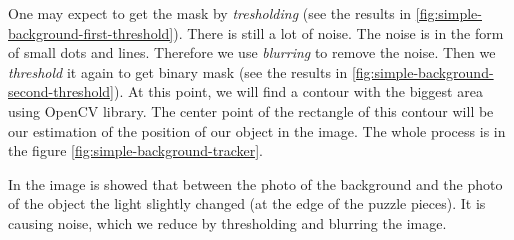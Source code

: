 One may expect to get the mask by \emph{tresholding} (see the results in
\ref{fig:simple-background-first-threshold}). There is still a lot of noise.
The noise is in the form of small dots and lines. Therefore we use
\emph{blurring} to remove the noise. Then we \emph{threshold} it again to get
binary mask (see the results in \ref{fig:simple-background-second-threshold}).
At this point, we will find a contour with the biggest area using OpenCV
library. The center point of the rectangle of this contour will be our
estimation of the position of our object in the image. The whole process is in
the figure \ref{fig:simple-background-tracker}.

In the image is showed that between the photo of the background and the photo
of the object the light slightly changed (at the edge of the puzzle pieces). It
is causing noise, which we reduce by thresholding and blurring the image.

